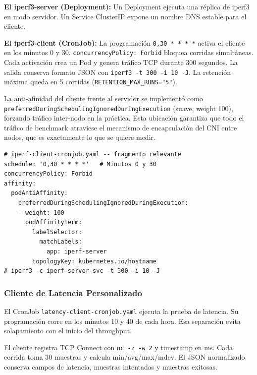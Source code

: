 \textbf{El iperf3-server (Deployment):} Un Deployment ejecuta una réplica de iperf3 en modo servidor. Un Service ClusterIP expone un nombre DNS estable para el cliente.

\textbf{El iperf3-client (CronJob):} La programación \texttt{0,30 * * * *} activa el cliente en los minutos 0 y 30. \texttt{concurrencyPolicy: Forbid} bloquea corridas simultáneas. Cada activación crea un Pod y genera tráfico TCP durante 300 segundos. La salida conserva formato JSON con \texttt{iperf3 -t 300 -i 10 -J}. La retención máxima queda en 5 corridas (\texttt{RETENTION\_MAX\_RUNS="5"}).

La anti-afinidad del cliente frente al servidor se implementó como \texttt{preferredDuringSchedulingIgnoredDuringExecution} (suave, weight 100), forzando tráfico inter-nodo en la práctica. Esta ubicación garantiza que todo el tráfico de benchmark atraviese el mecanismo de encapsulación del CNI entre nodos, que es exactamente lo que se quiere medir.

\begin{lstlisting}
# iperf-client-cronjob.yaml -- fragmento relevante
schedule: '0,30 * * * *'   # Minutos 0 y 30
concurrencyPolicy: Forbid
affinity:
  podAntiAffinity:
    preferredDuringSchedulingIgnoredDuringExecution:
    - weight: 100
      podAffinityTerm:
        labelSelector:
          matchLabels:
            app: iperf-server
        topologyKey: kubernetes.io/hostname
# iperf3 -c iperf-server-svc -t 300 -i 10 -J
\end{lstlisting}

\subsubsection{Cliente de Latencia Personalizado}

El CronJob \texttt{latency-client-cronjob.yaml} ejecuta la prueba de latencia. Su programación corre en los minutos 10 y 40 de cada hora. Esa separación evita solapamiento con el inicio del throughput.

El cliente registra TCP Connect con \texttt{nc -z -w 2} y timestamp en ms. Cada corrida toma 30 muestras y calcula min/avg/max/mdev. El JSON normalizado conserva campos de latencia, muestras intentadas y muestras exitosas.

